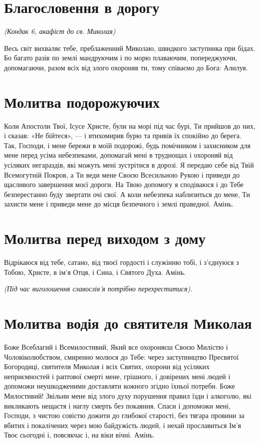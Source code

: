 \documentclass[chapters.tex]{subfiles}
\begin{document}
\section{Благословення в дорогу}
\emph{(Кондак 6, акафіст до св. Миколая)}

Весь світ вихваляє тебе, преблаженний Миколаю, швидкого заступника при бідах. Бо багато разів по землі мандруючим і по морю плаваючим, попереджуючи, допомагаючи, разом всіх від злого охороняв ти, тому співаємо до Бога: Алилуя.

\section{Молитва подорожуючих}
Коли Апостоли Твої, Ісусе Христе, були на морі під час бурі, Ти прийшов до них, і сказав: «Не бійтеся», — і втихомирив бурю та привів їх спокійно до берега. Так, Господи, і мене бережи в моїй подорожі, будь помічником і захисником для мене перед усіма небезпеками, допомагай мені в труднощах і охороняй від усіляких негараздів, які можуть мені зустрітися в дорозі. Я передаю себе від Твій Всемогутній Покров, а Ти веди мене Своєю Всесильною Рукою і приведи до щасливого завершення моєї дороги. На Твою допомогу я сподіваюся і до Тебе безперестанно буду звертати очі свої. А коли небезпека наблизиться до мене, Ти захисти мене і приведи мене до місця безпечного і землі праведної. Амінь.

\section{Молитва перед виходом з дому}
Відрікаюся від тебе, сатано, від твоєї гордості і служінню тобі, і з’єднуюся з Тобою, Христе, в ім’я Отця, і Сина, і Святого Духа. Амінь.

\emph{(Під час виголошення славослів’я потрібно перехреститися).}

\section{Молитва водія до святителя Миколая}
Боже Всеблагий і Всемилостивий, Який все охороняєш Своєю Милістю і Чоловіколюбством, смиренно молюся до Тебе: через заступництво Пресвятої Богородиці, святителя Миколая і всіх Святих, охорони від усіляких неприємностей і раптової смерті мене, грішного, і довірених мені людей і допоможи неушкодженими доставляти кожного згідно їхньої потреби. Боже Милостивий! Звільни мене від злого духу порушення правил їзди і алкоголю, які викликають нещастя і наглу смерть без покаяння. Спаси і допоможи мені, Господи, з чистою совістю дожити до глибокої старості, без тягара провини за вбитих і покалічених через мою байдужість людей, і нехай прославиться Ім’я Твоє сьогодні і, повсякчас і, на віки вічні. Амінь.
\end{document}
